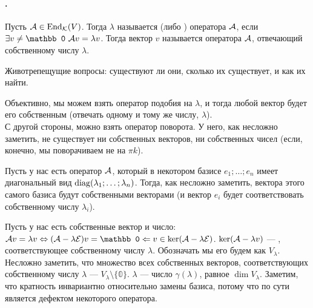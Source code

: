 \documentclass{article}
\newcommand*{\id}{{\scriptE}}
\begin{document}
    \paragraph{.}
    \begin{itemize}
        \dfn Пусть ${\mathcal{A}}\in\operatorname{End}_{\mathcal{K}}(V)$. Тогда $\lambda$ называется  (либо ) оператора ${\mathcal{A}}$, если $\exists v\neq\mathbb0~\scriptA v=\lambda v$. Тогда вектор $v$ называется  оператора ${\mathcal{A}}$, отвечающий собственному числу $\lambda$.
        \begin{Comment}
            Животрепещущие вопросы: существуют ли они, сколько их существует, и как их найти.
        \end{Comment}
        \begin{Example}
            Объективно, мы можем взять оператор подобия на $\lambda$, и тогда любой вектор будет его собственным (отвечать одному и тому же числу, $\lambda$).\\
            С другой стороны, можно взять оператор поворота. У него, как несложно заметить, не существует ни собственных векторов, ни собственных чисел (если, конечно, мы поворачиваем не на $\pi k$).
        \end{Example}
        \begin{Example}
            Пусть у нас есть оператор ${\mathcal{A}}$, который в некотором базисе $e_1;\ldots;e_n$ имеет диагональный вид $\operatorname{diag}(\lambda_1;\ldots;\lambda_n)$. Тогда, как несложно заметить, вектора этого самого базиса будут собственными векторами (и вектор $e_i$ будет соответствовать собственному числу $\lambda_i$).
        \end{Example}
        \dfn Пусть у нас есть собственные вектор и число: $\scriptA v=\lambda v\Leftrightarrow(\scriptA-\lambda\id)v=\mathbb0\Leftarrow v\in\ker(\scriptA-\lambda\id)$. $\ker({\mathcal{A}}-\lambda v)$ --- , соответствующее собственному числу $\lambda$. Обозначать мы его будем как $V_\lambda$.
        \thm Несложно заметить, что множество всех собственных векторов, соответствующих собственному числу $\lambda$ --- $V_\lambda\setminus\{\mathbb0\}$.
        \dfn {} $\lambda$ --- число $\gamma(\lambda)$, равное $\dim V_\lambda$.
    \thm Заметим, что кратность инвариантно относительно замены базиса, потому что по сути является дефектом некоторого оператора.

\end{itemize}
\end{document}
